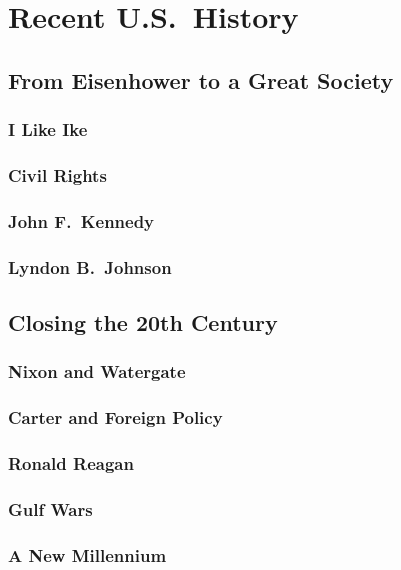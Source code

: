 \chapter{Recent U.S.\ History}

\section{From Eisenhower to a Great Society}

\subsection*{I Like Ike}

\subsection*{Civil Rights}


\subsection*{John F.\ Kennedy}

\subsection*{Lyndon B.\ Johnson}

\section{Closing the 20th Century}

\subsection*{Nixon and Watergate}

\subsection*{Carter and Foreign Policy}

\subsection*{Ronald Reagan}

\subsection*{Gulf Wars}

\subsection*{A New Millennium}
